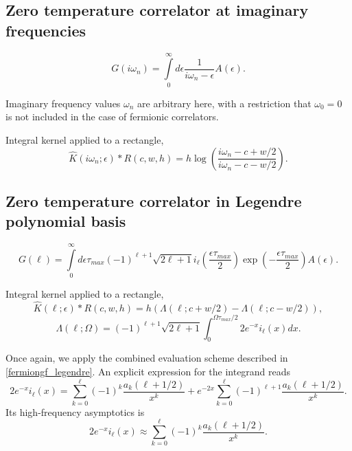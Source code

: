 \documentclass[]{article}
\begin{document}
\subsection{Zero temperature correlator at imaginary frequencies}
\label{zerotemp_imfreq}
\begin{equation}
	G(i\omega_n) = \int\limits_0^\infty
	d\epsilon \frac{1}{i\omega_n-\epsilon} A(\epsilon).
\end{equation}

Imaginary frequency values $\omega_n$ are arbitrary here, with a restriction that
$\omega_0 = 0$ is not included in the case of fermionic correlators.

Integral kernel applied to a rectangle,
\begin{equation}
\hat K(i\omega_n;\epsilon)*R(c,w,h) =
h \log\left(\frac{i\omega_n - c + w/2}{i\omega_n - c - w/2}\right).
\end{equation}

\subsection{Zero temperature correlator in Legendre polynomial basis}
\label{zerotemp_legendre}
\begin{equation}
	G(\ell) =
	\int\limits_0^\infty d\epsilon
	\tau_{max}(-1)^{\ell+1}\sqrt{2\ell+1}
	i_{\ell}\left(\frac{\epsilon\tau_{max}}{2}\right)
	\exp\left(-\frac{\epsilon\tau_{max}}{2}\right) A(\epsilon).
\end{equation}

Integral kernel applied to a rectangle,
\begin{equation}
	\hat K(\ell;\epsilon)*R(c,w,h) = h (\Lambda(\ell;c+w/2) - \Lambda(\ell;c-w/2)),
\end{equation}
\begin{equation}
	\Lambda(\ell;\Omega) = (-1)^{\ell+1}\sqrt{2\ell+1}
	\int_0^{\Omega\tau_{max}/2} 2e^{-x} i_\ell(x) dx.
\end{equation}

Once again, we apply the combined evaluation scheme described in
\ref{fermiongf_legendre}. An explicit expression for the integrand reads
\begin{equation}\label{il_x_exp_series}
	2e^{-x} i_\ell(x) =
	\sum_{k=0}^\ell(-1)^k
	\frac{a_k(\ell+1/2)}{x^k} +
	e^{-2x}\sum_{k=0}^\ell(-1)^{\ell+1}
	\frac{a_k(\ell+1/2)}{x^k}.
\end{equation}
Its high-frequency asymptotics is
\begin{equation}
	2e^{-x} i_\ell(x) \approx
	\sum_{k=0}^\ell(-1)^k \frac{a_k(\ell+1/2)}{x^k}.
\end{equation}
\end{document}
